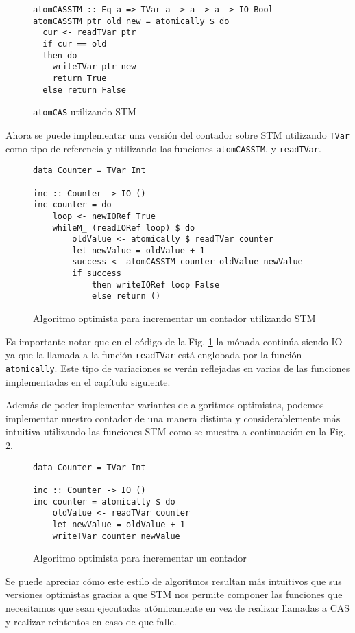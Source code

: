 \begin{figure}[H]
\begin{verbatim}
atomCASSTM :: Eq a => TVar a -> a -> a -> IO Bool
atomCASSTM ptr old new = atomically $ do
  cur <- readTVar ptr
  if cur == old
  then do
    writeTVar ptr new
    return True
  else return False
\end{verbatim}
\caption{\texttt{atomCAS} utilizando STM}
\end{figure}

Ahora se puede implementar una versión del contador sobre STM utilizando \texttt{TVar} como tipo de referencia y utilizando las funciones \texttt{atomCASSTM}, y \texttt{readTVar}.

\begin{figure}[H]
\begin{verbatim}
data Counter = TVar Int

inc :: Counter -> IO ()
inc counter = do
    loop <- newIORef True
    whileM_ (readIORef loop) $ do
        oldValue <- atomically $ readTVar counter
        let newValue = oldValue + 1
        success <- atomCASSTM counter oldValue newValue
        if success
            then writeIORef loop False
            else return ()
\end{verbatim}
\caption{Algoritmo optimista para incrementar un contador utilizando STM}
\label{fig:lockfree-counter-example-stm}
\end{figure}

Es importante notar que en el código de la Fig. \ref{fig:lockfree-counter-example-stm} la mónada continúa siendo IO ya que la llamada a la función \texttt{readTVar} está englobada por la función \texttt{atomically}. Este tipo de variaciones se verán reflejadas en varias de las funciones implementadas en el capítulo siguiente.

Además de poder implementar variantes de algoritmos optimistas, podemos implementar nuestro contador de una manera distinta y considerablemente más intuitiva utilizando las funciones STM como se muestra a continuación en la Fig. \ref{fig:counter-example-stm}.

\begin{figure}[H]
\begin{verbatim}
data Counter = TVar Int

inc :: Counter -> IO ()
inc counter = atomically $ do
    oldValue <- readTVar counter
    let newValue = oldValue + 1
    writeTVar counter newValue
\end{verbatim}
\caption{Algoritmo optimista para incrementar un contador}
\label{fig:counter-example-stm}
\end{figure}

Se puede apreciar cómo este estilo de algoritmos resultan más intuitivos que sus versiones optimistas gracias a que STM nos permite componer las funciones que necesitamos que sean ejecutadas atómicamente en vez de realizar llamadas a CAS y realizar reintentos en caso de que falle.
